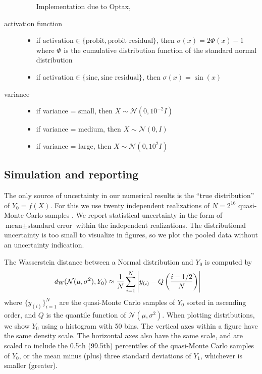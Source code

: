 \documentclass{article}
\begin{document}
\begin{description}
\begin{itemize}
    Implementation due to Optax, \citet{deepmind_deepmind_2020}
  \end{itemize}
  \item[activation function] 
  \begin{itemize}
    \item if \(\text{activation} \in \{\text{probit}, \text{probit residual}\}\), then \(\sigma(x) = 2\Phi(x) - 1\) where \(\Phi\) is the cumulative distribution function of the standard normal distribution
    \item if \(\text{activation} \in \{\text{sine}, \text{sine residual}\}\), then \(\sigma(x) = \sin(x)\)
  \end{itemize}
  \item[variance]
  \begin{itemize}
    \item if variance = small, then \(X \sim \mathcal N(0, 10^{-2}I)\)
    \item if variance = medium, then \(X \sim \mathcal N(0, I)\)
    \item if variance = large, then \(X \sim \mathcal N(0, 10^2I)\)
  \end{itemize}
\end{description}

\subsection*{Simulation and reporting}
The only source of uncertainty in our numerical results is the ``true distribution'' of \(Y_0=f(X)\).
For this we use twenty independent realizations of \(N=2^{16}\) quasi-Monte Carlo samples \citep{virtanen_scipy_2020}.
We report statistical uncertainty in the form of \(\text{mean} \pm \text{standard error}\) within the independent realizations.
The distributional uncertainty is too small to visualize in figures, so we plot the pooled data without an uncertainty indication.

The Wasserstein distance between a Normal distribution and \(Y_0\) is computed by
\begin{align*}
  d_\mathrm{W}(\mathcal N(\mu, \sigma^2), Y_0) 
  &\approx \frac{1}{N}\sum_{i=1}^N \left|y_{(i)} - Q\del{\frac{i -1/2}{N}}\right|
\end{align*}
where \(\{y_{(i)}\}_{i=1}^N\) are the quasi-Monte Carlo samples of \(Y_0\) sorted in ascending order, and \(Q\) is the quantile function of \(\mathcal N(\mu, \sigma^2)\).
When plotting distributions, we show \(Y_0\) using a histogram with 50 bins.
The vertical axes within a figure have the same density scale.
The horizontal axes also have the same scale, and are scaled to include the 0.5th (99.5th) percentiles of the quasi-Monte Carlo samples of \(Y_0\), or the mean minus (plus) three standard deviations of \(Y_1\), whichever is smaller (greater).
\end{document}
